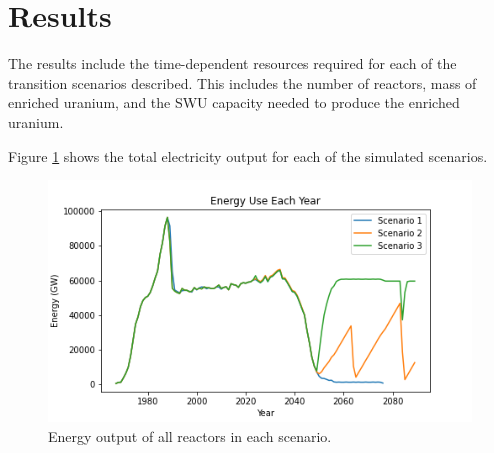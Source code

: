 \section{Results}

The results include the time-dependent resources required 
for each of the transition scenarios described. This includes 
the number of reactors, mass of enriched uranium, and the 
\gls{SWU} capacity needed to produce the enriched uranium.

Figure \ref{fig:energy} shows the total electricity output 
for each of the simulated scenarios. 

\begin{figure}
    \centering
    \includegraphics[]{figures/energy_all.png}
    \caption{Energy output of all reactors in each scenario.}
    \label{fig:energy}
\end{figure}